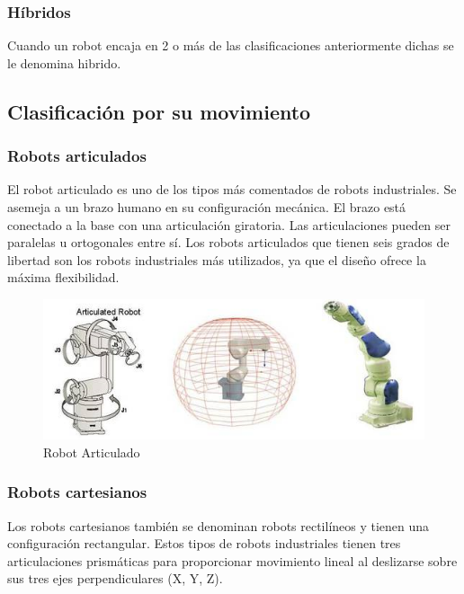         \subsubsection{Híbridos}
        Cuando un robot encaja en 2 o más de las clasificaciones anteriormente dichas se le denomina hibrido. 
        \newpage

    
    \subsection{Clasificación por su movimiento}
    
        \subsubsection{Robots articulados}
        
        El robot articulado es uno de los tipos más comentados de robots industriales. Se asemeja a un brazo humano en su configuración mecánica. El brazo está conectado a la base con una articulación giratoria. Las articulaciones pueden ser paralelas u ortogonales entre sí. Los robots articulados que tienen seis grados de libertad son los robots industriales más utilizados, ya que el diseño ofrece la máxima flexibilidad.
        
        \begin{figure}[htb]
            \centering
            \includegraphics[width=0.9\linewidth]{Main/Chapter2/Images2/Robot-articulado.png}
            \caption{Robot Articulado}
            \label{f:Cap2_segunMovimiento_articulado}
        \end{figure}
        
        \subsubsection{Robots cartesianos}
        
        Los robots cartesianos también se denominan robots rectilíneos y tienen una configuración rectangular. Estos tipos de robots industriales tienen tres articulaciones prismáticas para proporcionar movimiento lineal al deslizarse sobre sus tres ejes perpendiculares (X, Y, Z). 
        
